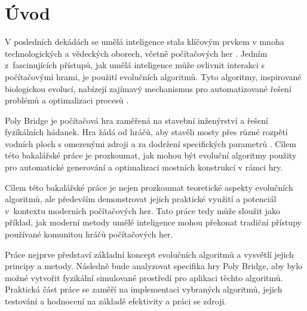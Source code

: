 \chapter*{Úvod}

V posledních dekádách se umělá inteligence stala klíčovým prvkem v mnoha technologických a vědeckých oborech, včetně počítačových her \cite{mnih2013playing} \cite{Vinyals2019}. Jedním z~fascinujících přístupů, jak umělá inteligence může ovlivnit interakci s počítačovými hrami, je použití evolučních algoritmů. Tyto algoritmy, inspirované biologickou evolucí, nabízejí zajímavý mechanismus pro automatizované řešení problémů a optimalizaci procesů \cite{EibenSmith2015}.

Poly Bridge je počítačová hra zaměřená na stavební inženýrství a řešení fyzikálních hádanek. Hra žádá od hráčů, aby stavěli mosty přes různé rozpětí vodních ploch s omezenými zdroji a za dodržení specifických parametrů \cite{drycactus}. Cílem této bakalářské práce je prozkoumat, jak mohou být evoluční algoritmy použity pro automatické generování a optimalizaci mostních konstrukcí v rámci hry.

Cílem této bakalářské práce je nejen prozkoumat teoretické aspekty evolučních algoritmů, ale především demonstrovat jejich praktické využití a potenciál v~kontextu moderních počítačových her. Tato práce tedy může sloužit jako příklad, jak moderní metody umělé inteligence mohou překonat tradiční přístupy používané komunitou hráčů počítačových her. 

Práce nejprve představí základní koncept evolučních algoritmů a vysvětlí jejich principy a metody. Následně bude analyzovat specifika hry Poly Bridge, aby bylo možné vytvořit fyzikální simulované prostředí pro aplikaci těchto algoritmů. Praktická část práce se zaměří na implementaci vybraných algoritmů, jejich testování a hodnocení na základě efektivity a práci se zdroji.


